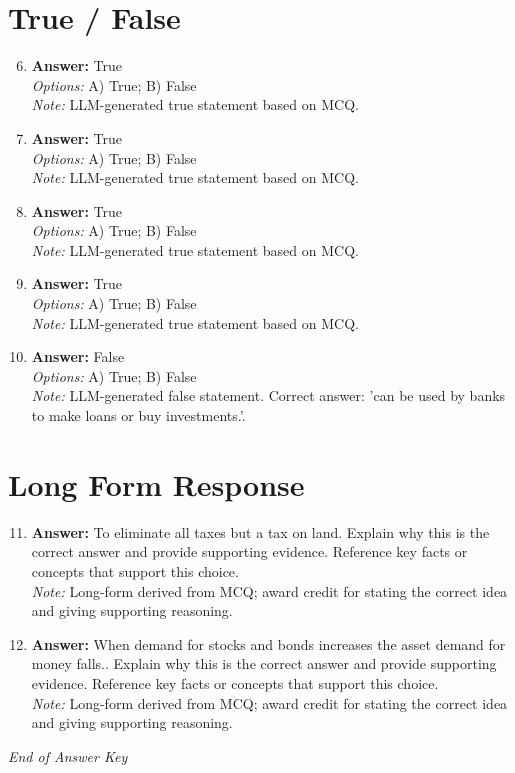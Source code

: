 \documentclass[12pt]{article}
\begin{document}
\section*{True / False}
\begin{enumerate}[label=\arabic*.]
\setcounter{enumi}{5}
\item \textbf{Answer:} True
\\ \textit{Options:} A) True; B) False
\\ \textit{Note:} LLM-generated true statement based on MCQ.
\item \textbf{Answer:} True
\\ \textit{Options:} A) True; B) False
\\ \textit{Note:} LLM-generated true statement based on MCQ.
\item \textbf{Answer:} True
\\ \textit{Options:} A) True; B) False
\\ \textit{Note:} LLM-generated true statement based on MCQ.
\item \textbf{Answer:} True
\\ \textit{Options:} A) True; B) False
\\ \textit{Note:} LLM-generated true statement based on MCQ.
\item \textbf{Answer:} False
\\ \textit{Options:} A) True; B) False
\\ \textit{Note:} LLM-generated false statement. Correct answer: 'can be used by banks to make loans or buy investments.'.
\end{enumerate}

\section*{Long Form Response}
\begin{enumerate}[label=\arabic*.]
\setcounter{enumi}{10}
\item \textbf{Answer:} To eliminate all taxes but a tax on land. Explain why this is the correct answer and provide supporting evidence. Reference key facts or concepts that support this choice.
\\ \textit{Note:} Long-form derived from MCQ; award credit for stating the correct idea and giving supporting reasoning.
\item \textbf{Answer:} When demand for stocks and bonds increases the asset demand for money falls.. Explain why this is the correct answer and provide supporting evidence. Reference key facts or concepts that support this choice.
\\ \textit{Note:} Long-form derived from MCQ; award credit for stating the correct idea and giving supporting reasoning.
\end{enumerate}

\vfill
\noindent\textit{End of Answer Key}
\end{document}

